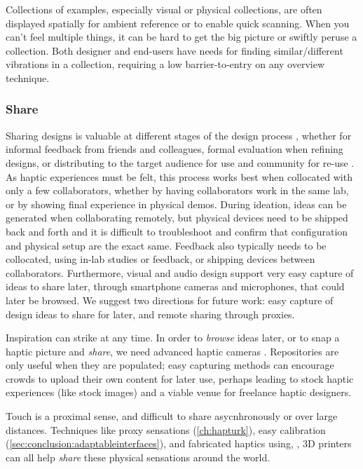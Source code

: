     Collections of examples, especially visual or physical collections, are often displayed spatially for ambient reference or to enable quick scanning.
    When you can't feel multiple things, it can be hard to get the big picture or swiftly peruse a collection.
    Both designer and end-users have needs for finding similar/different vibrations in a collection, requiring a low barrier-to-entry on any overview technique.


%
%
\subsubsection{Share} 
Sharing designs is valuable at different stages of the design process \cite{Kulkarni2012}, whether for informal feedback from friends and colleagues, formal evaluation when refining designs, or distributing to the target audience for use and community for re-use \cite{Shneiderman2007}.
As haptic experiences must be felt, this process works best when collocated with only a few collaborators, whether by having collaborators work in the same lab, or by showing final experience in physical demos.
During ideation, ideas can be generated when collaborating remotely, but physical devices need to be shipped back and forth and it is difficult to troubleshoot and confirm that configuration and physical setup are the exact same.
Feedback also typically needs to be collocated, using in-lab studies or feedback, or shipping devices between collaborators.
Furthermore, visual and audio design support very easy capture of ideas to share later, through smartphone cameras and microphones, that could later be browsed.
We suggest two  directions for future work: easy capture of design ideas to share for later, and remote sharing through proxies.

Inspiration can strike at any time.
In order to \emph{browse} ideas later, or to snap a haptic picture and \emph{share}, we need advanced haptic cameras \cite{MacLean1996}.
Repositories are only useful when they are populated; easy capturing methods can encourage crowds to upload their own content for later use, perhaps leading to stock haptic experiences (like stock images) and a viable venue for freelance haptic designers.

Touch is a proximal sense, and difficult to share asycnhronously or over large distances.
Techniques like proxy sensations (\autoref{ch:hapturk}), easy calibration (\autoref{sec:conclusion:adaptableinterfaces}), and fabricated haptics using, \eg, 3D printers \cite{torres2015hapticprint} can all help \emph{share} these physical sensations around the world.


